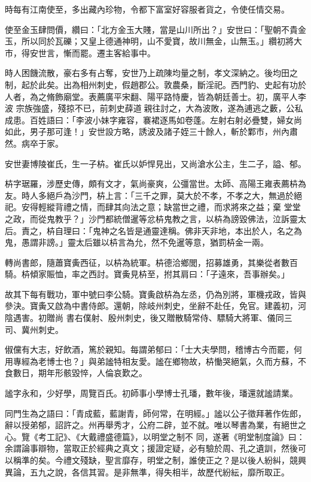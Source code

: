 \begin{pinyinscope}
 時每有江南使至，多出藏內珍物，令都下富室好容服者貨之，令使任情交易。



 使至金玉肆問價，纘曰：「北方金玉大賤，當是山川所出？」安世曰：「聖朝不貴金玉，所以同於瓦礫；又皇上德通神明，山不愛寶，故川無金，山無玉。」纘初將大市，得安世言，慚而罷。遷主客給事中。



 時人困饑流散，豪右多有占奪，安世乃上疏陳均量之制，孝文深納之。後均田之制，起於此矣。出為相州刺史，假趙郡公。敦農桑，斷淫祀。西門豹、史起有功於人者，為之脩飾廟堂。表薦廣平宋翻、陽平路恃慶，皆為朝廷善士。初，廣平人李波
 宗族強盛，殘掠不已，前刺史薛道親往討之，大為波敗，遂為逋逃之藪，公私成患。百姓語曰：「李波小妹字雍容，褰裙逐馬如卷蓬。左射右射必疊雙，婦女尚如此，男子那可逢！」安世設方略，誘波及諸子姪三十餘人，斬於鄴市，州內肅然。病卒于家。



 安世妻博陵崔氏，生一子枿。崔氏以妒悍見出，又尚滄水公主，生二子，謚、郁。



 枿字琚羅，涉歷史傳，頗有文才，氣尚豪爽，公彊當世。太師、高陽王雍表薦枿為友。時人多絕戶為沙門，枿上言：「三千之罪，莫大於不孝，不孝之大，無過於絕祀。安得輕縱背禮之情，而肆其向法之意；缺當世之禮，而求將來之益；棄
 堂堂之政，而從鬼教乎？」沙門都統僧暹等忿枿鬼教之言，以枿為謗毀佛法，泣訴靈太后。責之，枿自理曰：「鬼神之名皆是通靈達稱。佛非天非地，本出於人，名之為鬼，愚謂非謗。」靈太后雖以枿言為允，然不免暹等意，猶罰枿金一兩。



 轉尚書郎，隨蕭寶夤西征，以枿為統軍。枿德洽鄉閭，招募雄勇，其樂從者數百騎。枿傾家賑恤，率之西討。寶夤見枿至，拊其肩曰：「子遠來，吾事辦矣。」



 故其下每有戰功，軍中號曰李公騎。寶夤啟枿為左丞，仍為別將，軍機戎政，皆與參決。寶夤又啟為中書侍郎。還朝，除岐州刺史，坐辭不赴任，免官。建義初，河陰遇害。初贈尚
 書右僕射、殷州刺史，後又贈散騎常侍、驃騎大將軍、儀同三司、冀州刺史。



 俶儻有大志，好飲酒，篤於親知。每謂弟郁曰：「士大夫學問，稽博古今而罷，何用專經為老博士也？」與弟謐特相友愛。謐在鄉物故，枿慟哭絕氣，久而方蘇，不食數日，期年形骸毀悴，人倫哀歎之。



 謐字永和，少好學，周覽百氏。初師事小學博士孔璠，數年後，璠還就謐請業。



 同門生為之語曰：「青成藍，藍謝青，師何常，在明經。」謐以公子徵拜著作佐郎，辭以授弟郁，詔許之。州再舉秀才，公府二辟，並不就。唯以琴書為業，有絕世之心。覽《考工記》、《大戴禮盛德篇》，以明堂之制不
 同，遂著《明堂制度論》曰：余謂論事辯物，當取正於經典之真文；援證定疑，必有驗於周、孔之遺訓，然後可以稱準的矣。今禮文殘缺，聖言靡存，明堂之制，誰使正之？是以後人紛糾，競興異論，五九之說，各信其習。是非無準，得失相半，故歷代紛紜，靡所取正。




\end{pinyinscope}
